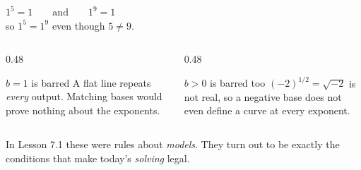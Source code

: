 \documentclass[aspectratio=169, 11pt]{beamer}
\begin{document}
\begin{frame}[t, plain]
  \begin{center}
    \Large $1^{5} = 1 \qquad\text{and}\qquad 1^{9} = 1$ \\[6pt]
    \normalsize so $1^{5}=1^{9}$ \; even though \; $5\neq9$.
  \end{center}
  \vspace{10pt}
  \begin{columns}[T]
    \begin{column}{0.48\textwidth}
      \begin{block}{$b=1$ is barred}
        A flat line repeats \emph{every} output. Matching bases would prove nothing about the
        exponents.
      \end{block}
    \end{column}
    \begin{column}{0.48\textwidth}
      \begin{block}{$b>0$ is barred too}
        $(-2)^{1/2}=\sqrt{-2}$ is not real, so a negative base does not even define a curve at every
        exponent.
      \end{block}
    \end{column}
  \end{columns}
  \vspace{8pt}
  \begin{center}
    {\footnotesize In Lesson 7.1 these were rules about \emph{models}. They turn out to be exactly the
    conditions that make today's \emph{solving} legal.}
  \end{center}
\end{frame}
\end{document}
